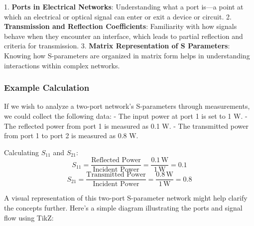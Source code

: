 1. \textbf{Ports in Electrical Networks}: Understanding what a port is—a point at which an electrical or optical signal can enter or exit a device or circuit.
2. \textbf{Transmission and Reflection Coefficients}: Familiarity with how signals behave when they encounter an interface, which leads to partial reflection and criteria for transmission.
3. \textbf{Matrix Representation of S Parameters}: Knowing how S-parameters are organized in matrix form helps in understanding interactions within complex networks.

\subsubsection{Example Calculation}
If we wish to analyze a two-port network's S-parameters through measurements, we could collect the following data:
- The input power at port 1 is set to 1 W.
- The reflected power from port 1 is measured as 0.1 W.
- The transmitted power from port 1 to port 2 is measured as 0.8 W.

Calculating \( S_{11} \) and \( S_{21} \):
\[
S_{11} = \frac{\text{Reflected Power}}{\text{Incident Power}} = \frac{0.1 \, \text{W}}{1 \, \text{W}} = 0.1
\]
\[
S_{21} = \frac{\text{Transmitted Power}}{\text{Incident Power}} = \frac{0.8 \, \text{W}}{1 \, \text{W}} = 0.8
\]

A visual representation of this two-port S-parameter network might help clarify the concepts further. Here's a simple diagram illustrating the ports and signal flow using TikZ:

